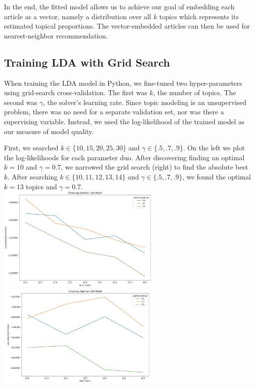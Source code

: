 \documentclass[11pt]{article}
\begin{document}
In the end, the fitted model allows us to achieve our goal of embedding each article as a vector, namely a distribution over all $k$ topics which represents its estimated topical proportions. The vector-embedded articles can then be used for nearest-neighbor recommendation. 

\subsection{Training LDA with Grid Search}
When training the LDA model in Python, we fine-tuned two hyper-parameters using grid-search cross-validation. The first was $k$, the number of topics.  The second was $\gamma$, the solver's learning rate.  Since topic modeling is an unsupervised problem, there was no need for a separate validation set, nor was there a supervising variable.  Instead, we used the log-likelihood of the trained model as our measure of model quality. 

First, we searched $k \in \{10, 15, 20, 25, 30\}$ and $\gamma \in \{.5, .7, .9\}$. On the left we plot the log-likelihoods for each parameter duo. After discovering finding an optimal $k=10$ and $\gamma = 0.7$, we narrowed the grid search (right) to find the absolute best $k$.  After searching $k \in \{10, 11, 12, 13, 14\}$ and $\gamma \in \{.5, .7, .9\}$, we found the optimal $k=13$ topics and $\gamma = 0.7$. \\

\includegraphics[width=225pt]{gridsearch.png} \includegraphics[width=225pt]{gridsearch2.png} 
\end{document}
